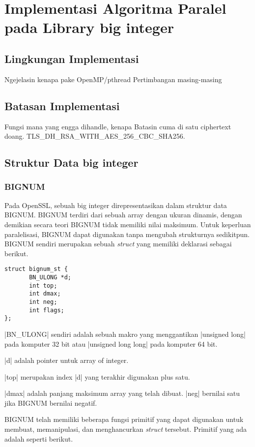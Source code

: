 
\section{Implementasi Algoritma Paralel pada Library big integer}
\subsection{Lingkungan Implementasi}
Ngejelasin kenapa pake OpenMP/pthread
Pertimbangan masing-masing

\subsection{Batasan Implementasi}
Fungsi mana yang engga dihandle, kenapa
Batasin cuma di satu ciphertext doang. TLS\_DH\_RSA\_WITH\_AES\_256\_CBC\_SHA256.

\subsection{Struktur Data big integer}
\subsubsection{BIGNUM}
Pada OpenSSL, sebuah big integer direpresentasikan dalam struktur data BIGNUM. BIGNUM terdiri dari sebuah array dengan ukuran dinamis, dengan demikian secara teori BIGNUM tidak memiliki nilai maksimum. Untuk keperluan paralelisasi, BIGNUM dapat digunakan tanpa mengubah strukturnya sedikitpun. BIGNUM sendiri merupakan sebuah \textit{struct} yang memiliki deklarasi sebagai berikut.

\begin{lstlisting}[caption=Struktur BIGNUM]
struct bignum_st {
       BN_ULONG *d;
       int top;
       int dmax;
       int neg;
       int flags;
};
\end{lstlisting}

|BN_ULONG| sendiri adalah sebuah makro yang menggantikan |unsigned long| pada komputer 32 bit atau |unsigned long long| pada komputer 64 bit.

|d| adalah pointer untuk array of integer.

|top| merupakan index |d| yang terakhir digunakan plus satu.

|dmax| adalah panjang maksimum array yang telah dibuat. |neg| bernilai satu jika BIGNUM bernilai negatif.

BIGNUM telah memiliki beberapa fungsi primitif yang dapat digunakan untuk membuat, memanipulasi, dan menghancurkan \textit{struct} tersebut. Primitif yang ada adalah seperti berikut.

